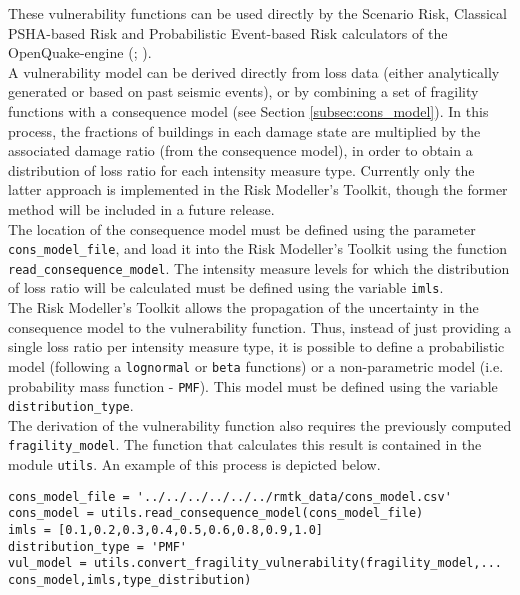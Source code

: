 These vulnerability functions can be used directly by the Scenario Risk, Classical PSHA-based Risk and Probabilistic Event-based Risk calculators of the OpenQuake-engine (\cite{SilvaEtAl2014a}; \cite{PaganiEtAl2014a}). \\

A vulnerability model can be derived directly from loss data (either analytically generated or based on past seismic events), or by combining a set of fragility functions with a consequence model (see Section \ref{subsec:cons_model}). In this process, the fractions of buildings in each damage state are multiplied by the associated damage ratio (from the consequence model), in order to obtain a distribution of loss ratio for each intensity measure type. Currently only the latter approach is implemented in the Risk Modeller's Toolkit, though the former method will be included in a future release.\\

The location of the consequence model must be defined using the parameter \verb=cons_model_file=, and load it into the Risk Modeller's Toolkit using the function \verb=read_consequence_model=. The intensity measure levels for which the distribution of loss ratio will be calculated must be defined using the variable \verb=imls=.\\

The Risk Modeller's Toolkit allows the propagation of the uncertainty in the consequence model to the vulnerability function. Thus, instead of just providing a single loss ratio per intensity measure type, it is possible to define a probabilistic model (following a \verb=lognormal= or \verb=beta= functions) or a non-parametric model (i.e. probability mass function - \verb=PMF=). This model must be defined using the variable \verb= distribution_type=.\\

The derivation of the vulnerability function also requires the previously computed \verb=fragility_model=. The function that calculates this result is contained in the module \verb=utils=. An example of this process is depicted below.

\begin{Verbatim}[frame=single, commandchars=\\\{\}, samepage=true]
cons_model_file = '../../../../../../rmtk_data/cons_model.csv'
cons_model = utils.read_consequence_model(cons_model_file)
imls = [0.1,0.2,0.3,0.4,0.5,0.6,0.8,0.9,1.0]
distribution_type = 'PMF'
vul_model = utils.convert_fragility_vulnerability(fragility_model,...
cons_model,imls,type_distribution)
\end{Verbatim}

